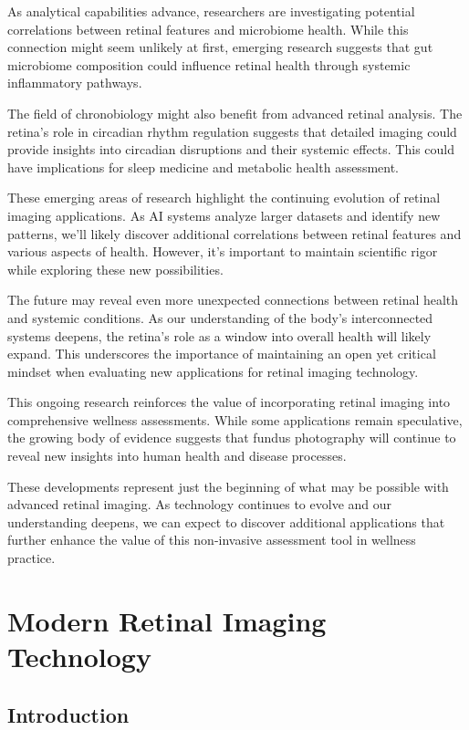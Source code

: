\documentclass[
  Letterpaper,
]{scrbook}
\begin{document}
As analytical capabilities advance, researchers are investigating
potential correlations between retinal features and microbiome health.
While this connection might seem unlikely at first, emerging research
suggests that gut microbiome composition could influence retinal health
through systemic inflammatory pathways.

The field of chronobiology might also benefit from advanced retinal
analysis. The retina's role in circadian rhythm regulation suggests that
detailed imaging could provide insights into circadian disruptions and
their systemic effects. This could have implications for sleep medicine
and metabolic health assessment.

These emerging areas of research highlight the continuing evolution of
retinal imaging applications. As AI systems analyze larger datasets and
identify new patterns, we'll likely discover additional correlations
between retinal features and various aspects of health. However, it's
important to maintain scientific rigor while exploring these new
possibilities.

The future may reveal even more unexpected connections between retinal
health and systemic conditions. As our understanding of the body's
interconnected systems deepens, the retina's role as a window into
overall health will likely expand. This underscores the importance of
maintaining an open yet critical mindset when evaluating new
applications for retinal imaging technology.

This ongoing research reinforces the value of incorporating retinal
imaging into comprehensive wellness assessments. While some applications
remain speculative, the growing body of evidence suggests that fundus
photography will continue to reveal new insights into human health and
disease processes.

These developments represent just the beginning of what may be possible
with advanced retinal imaging. As technology continues to evolve and our
understanding deepens, we can expect to discover additional applications
that further enhance the value of this non-invasive assessment tool in
wellness practice.


\chapter{Modern Retinal Imaging
Technology}\label{modern-retinal-imaging-technology}

\section{Introduction}\label{introduction}
\end{document}

